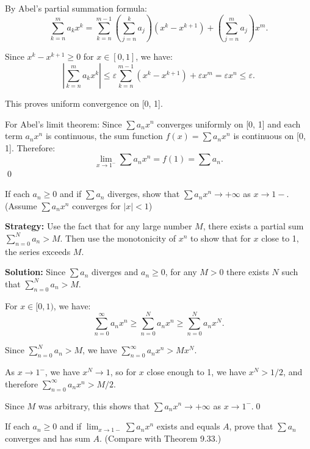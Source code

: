 By Abel's partial summation formula:
\[\sum_{k=n}^m a_k x^k = \sum_{k=n}^{m-1} \left(\sum_{j=n}^k a_j\right)(x^k - x^{k+1}) + \left(\sum_{j=n}^m a_j\right)x^m.\]

Since \( x^k - x^{k+1} \geq 0 \) for \( x \in [0, 1] \), we have:
\[\left|\sum_{k=n}^m a_k x^k\right| \leq \varepsilon \sum_{k=n}^{m-1} (x^k - x^{k+1}) + \varepsilon x^m = \varepsilon x^n \leq \varepsilon.\]

This proves uniform convergence on [0, 1].

For Abel's limit theorem: Since \( \sum a_n x^n \) converges uniformly on [0, 1] and each term \( a_n x^n \) is continuous, the sum function \( f(x) = \sum a_n x^n \) is continuous on [0, 1]. Therefore:
\[\lim_{x \to 1^-} \sum a_n x^n = f(1) = \sum a_n.\]\qed


\begin{problembox}
\begin{problemstatement}
If each \( a_n \geq 0 \) and if \( \sum a_n \) diverges, show that \( \sum a_n x^n \to + \infty \) as \( x \to 1- \). (Assume \( \sum a_n x^n \) converges for \( |x| < 1 \))
\end{problemstatement}
\end{problembox}

\noindent\textbf{Strategy:} Use the fact that for any large number \( M \), there exists a partial sum \( \sum_{n=0}^N a_n > M \). Then use the monotonicity of \( x^n \) to show that for \( x \) close to 1, the series exceeds \( M \).

\bigskip\noindent\textbf{Solution:} Since \( \sum a_n \) diverges and \( a_n \geq 0 \), for any \( M > 0 \) there exists \( N \) such that \( \sum_{n=0}^N a_n > M \).

For \( x \in [0, 1) \), we have:
\[\sum_{n=0}^{\infty} a_n x^n \geq \sum_{n=0}^N a_n x^n \geq \sum_{n=0}^N a_n x^N.\]

Since \( \sum_{n=0}^N a_n > M \), we have \( \sum_{n=0}^{\infty} a_n x^n > M x^N \).

As \( x \to 1^- \), we have \( x^N \to 1 \), so for \( x \) close enough to 1, we have \( x^N > 1/2 \), and therefore \( \sum_{n=0}^{\infty} a_n x^n > M/2 \).

Since \( M \) was arbitrary, this shows that \( \sum a_n x^n \to +\infty \) as \( x \to 1^- \).\qed


\begin{problembox}
\begin{problemstatement}
If each \( a_n \geq 0 \) and if \( \lim_{x \to 1-} \sum a_n x^n \) exists and equals \( A \), prove that \( \sum a_n \) converges and has sum \( A \). (Compare with Theorem 9.33.)
\end{problemstatement}
\end{problembox}

